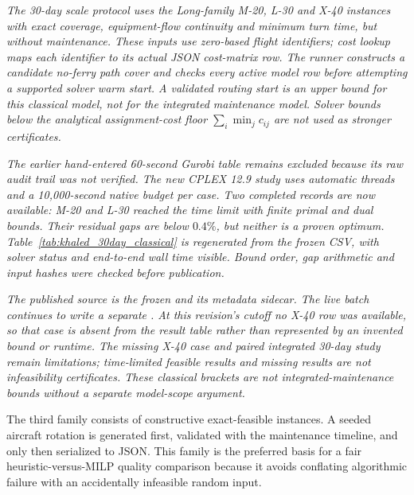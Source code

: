 \textit{The 30-day scale protocol uses the Long-family M-20, L-30 and X-40
instances with exact coverage, equipment-flow continuity and minimum turn time,
but without maintenance. These inputs use zero-based flight identifiers;
cost lookup maps each identifier to its actual JSON cost-matrix row. The runner
constructs a candidate no-ferry path cover and checks every active model row
before attempting a supported solver warm start. A validated routing start is
an upper bound for this classical model, not for the integrated maintenance
model. Solver bounds below the analytical assignment-cost floor
$\sum_i\min_j c_{ij}$ are not used as stronger certificates.}

\textit{The earlier hand-entered 60-second Gurobi table remains excluded because
its raw audit trail was not verified. The new CPLEX 12.9 study uses automatic
threads and a 10{,}000-second native budget per case. Two completed records
are now available: M-20 and L-30 reached the time limit with finite primal and
dual bounds. Their residual gaps are below $0.4\%$, but neither is a proven
optimum. Table~\ref{tab:khaled_30day_classical} is regenerated from the frozen
CSV, with solver status and end-to-end wall time visible. Bound order, gap
arithmetic and input hashes were checked before publication.}



\textit{The published source is the frozen
and its metadata sidecar. The live batch continues to write a separate
.
At this revision's cutoff no X-40 row was available, so that case is absent
from the result table rather than represented by an invented bound or runtime.
The missing X-40 case and paired integrated 30-day study remain limitations;
time-limited feasible results and missing results are not infeasibility
certificates. These classical brackets are not integrated-maintenance bounds
without a separate model-scope argument.}

The third family consists of constructive exact-feasible instances. A seeded
aircraft rotation is generated first, validated with the maintenance timeline,
and only then serialized to JSON. This family is the preferred basis for a fair
heuristic-versus-MILP quality comparison because it avoids conflating algorithmic
failure with an accidentally infeasible random input.

